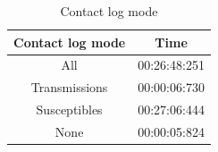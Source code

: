 \documentclass[runningheads]{llncs}
\begin{document}
\begin{table}[!h]
	\centering
	\begin{tabular}{|c|c|}
		\hline
		Contact log mode & Time \\\hline
   		All 			& 00:26:48:251 \\\hline
   		Transmissions 	& 00:00:06:730 \\\hline
   		Susceptibles 	& 00:27:06:444 \\\hline
   		None 			& 00:00:05:824 \\
    	\hline
	\end{tabular}
	\caption{Contact log mode}
\end{table}
\end{document}
